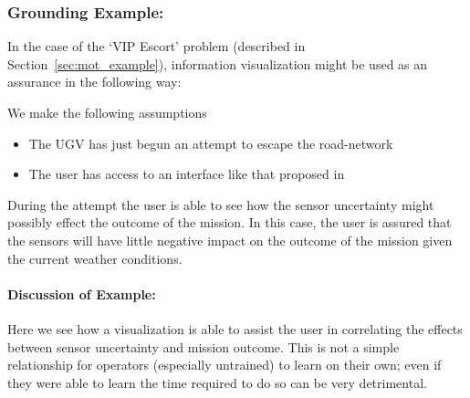 \subsubsection{Grounding Example:}
In the case of the `VIP Escort' problem (described in Section~\ref{sec:mot_example}), information visualization might be used as an assurance in the following way:

We make the following assumptions

\begin{itemize}
    \item The UGV has just begun an attempt to escape the road-network
    \item The user has access to an interface like that proposed in \cite{Hutchins2015-if}
\end{itemize}

During the attempt the user is able to see how the sensor uncertainty might possibly effect the outcome of the mission. In this case, the user is assured that the sensors will have little negative impact on the outcome of the mission given the current weather conditions.

\paragraph{\textbf{Discussion of Example:}} Here we see how a visualization is able to assist the user in correlating the effects between sensor uncertainty and mission outcome. This is not a simple relationship for operators (especially untrained) to learn on their own; even if they were able to learn the time required to do so can be very detrimental.
